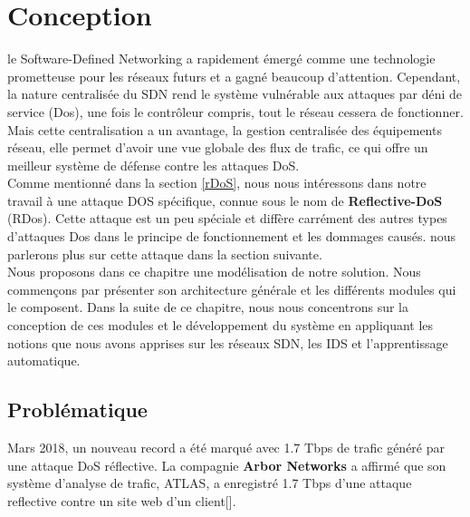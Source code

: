 \chapter{Conception}

\label{Chapter4} 
le Software-Defined Networking a rapidement émergé comme une technologie prometteuse pour les réseaux futurs et a gagné beaucoup d'attention. Cependant, la nature centralisée du SDN rend le système vulnérable aux attaques par déni de service (Dos), une fois le contrôleur compris, tout le réseau cessera de fonctionner. Mais cette centralisation a un avantage, la gestion centralisée des équipements réseau, elle permet d'avoir une vue globale des flux de trafic, ce qui offre un meilleur système de défense contre les attaques DoS.\\

Comme mentionné dans la section \ref{rDoS}, nous nous intéressons dans notre travail à une attaque DOS spécifique, connue sous le nom de \textbf{Reflective-DoS} (RDos). Cette attaque est un peu spéciale et diffère carrément des autres types d'attaques Dos dans le principe de fonctionnement et les dommages causés. nous parlerons plus sur cette attaque dans la section suivante. \\

Nous proposons dans ce chapitre une modélisation de notre solution. Nous commençons par présenter son architecture générale et les différents modules qui le composent. Dans la suite de ce chapitre, nous nous concentrons sur la conception de ces modules et le développement du système en appliquant les notions que nous avons apprises sur les réseaux SDN, les IDS et l’apprentissage automatique.

\section{Problématique}
Mars 2018, un nouveau record a été marqué avec 1.7 Tbps de trafic généré par une attaque DoS réflective. La compagnie \textbf{Arbor Networks} a affirmé que son système d'analyse de trafic, ATLAS, a enregistré 1.7 Tbps d'une attaque reflective contre un site web d'un client[\cite{22}].\\

